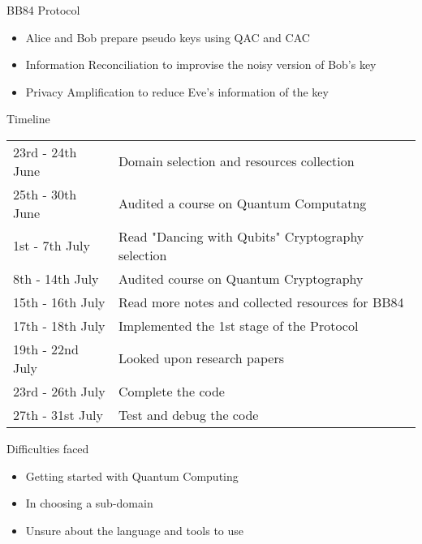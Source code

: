\documentclass[10 pt]{beamer}
\begin{document}
\begin{frame}{BB84 Protocol}
    \begin{itemize}[<+->]
        \item Alice and Bob prepare pseudo keys using QAC and CAC
        \item Information Reconciliation to improvise the noisy version of Bob's key
        \item Privacy Amplification to reduce Eve's information of the key
    \end{itemize}
\end{frame}


\begin{frame}{Timeline}
    \begin{tabular}{ll}
            23rd - 24th June & Domain selection and resources collection\\
            25th - 30th June & Audited a course on Quantum Computatng\\
            1st - 7th July & Read "Dancing with Qubits" Cryptography selection\\
            8th - 14th July & Audited course on Quantum Cryptography\\
            15th - 16th July & Read more notes and collected resources for BB84\\
            17th - 18th July & Implemented the 1st stage of the Protocol\\
            19th - 22nd July & Looked upon research papers\\
            23rd - 26th July & Complete the code\\
            27th - 31st July & Test and debug the code\\
     \end{tabular}
\end{frame}

\begin{frame}{Difficulties faced}
	\begin{itemize}
		\item Getting started with Quantum Computing
        \item In choosing a sub-domain
        \item Unsure about the language and tools to use
	\end{itemize}
\end{frame}
		
\end{document}
